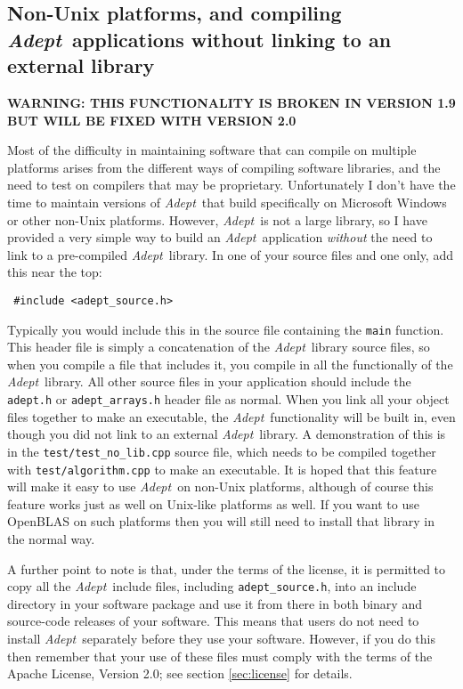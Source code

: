 \documentclass[a4,oneside]{book}
\def\codesize{\small}
\def\Adept{\emph{Adept}}
\def\code#1{{\codesize\texttt{#1}}}
\begin{document}
\subsection{Non-Unix platforms, and compiling \Adept\ applications
  without linking to an external library}
\label{sec:non-unix}
{\bf WARNING: THIS FUNCTIONALITY IS BROKEN IN VERSION 1.9 BUT WILL BE FIXED WITH VERSION 2.0}

Most of the difficulty in maintaining software that can compile on
multiple platforms arises from the different ways of compiling
software libraries, and the need to test on compilers that may be
proprietary.  Unfortunately I don't have the time to maintain versions
of \Adept\ that build specifically on Microsoft Windows or other
non-Unix platforms.  However, \Adept\ is not a large library, so I
have provided a very simple way to build an \Adept\ application
\emph{without} the need to link to a pre-compiled \Adept\ library. In
one of your source files and one only, add this near the top:
\begin{lstlisting}
 #include <adept_source.h>
\end{lstlisting}
Typically you would include this in the source file containing the
\code{main} function.  This header file is simply a concatenation of
the \Adept\ library source files, so when you compile a file that
includes it, you compile in all the functionally of the
\Adept\ library. All other source files in your application should
include the \code{adept.h} or \code{adept\_arrays.h} header file as normal.  When you link all
your object files together to make an executable, the
\Adept\ functionality will be built in, even though you did not link
to an external \Adept\ library.  A demonstration of this is in the
\code{test/test\_no\_lib.cpp} source file, which needs to be compiled
together with \code{test/algorithm.cpp} to make an executable.
%
It is hoped that this feature will make it easy to use \Adept\ on
non-Unix platforms, although of course this feature works just as well
on Unix-like platforms as well.  If you want to use OpenBLAS on such
platforms then you will still need to install that library in the
normal way.

A further point to note is that, under the terms of the license, it is
permitted to copy all the \Adept\ include files, including
\code{adept\_source.h}, into an include directory in your software
package and use it from there in both binary and source-code releases
of your software. This means that users do not need to install
\Adept\ separately before they use your software.  However, if you do
this then remember that your use of these files must comply with the
terms of the Apache License, Version 2.0; see section
\ref{sec:license} for details.
%
\end{document}
